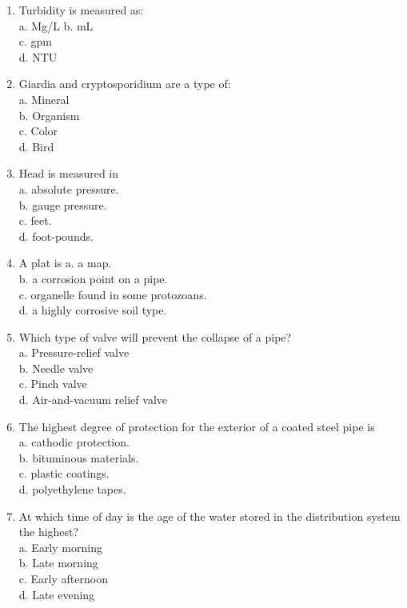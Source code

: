 \documentclass[10pt]{article}
\begin{document}
\begin{enumerate}
\item  Turbidity is measured as:\\
a.  Mg/L
b.  mL\\
c.  gpm\\
d.  NTU\\

\item  Giardia and cryptosporidium are a type of:\\
a.  Mineral\\
b.  Organism\\
c.  Color\\
d.  Bird\\



\item Head is measured in\\
a. absolute pressure.\\
b. gauge pressure.\\
c. feet.\\
d. foot-pounds.

\item A plat is
a. a map.\\
b. a corrosion point on a pipe.\\
c. organelle found in some protozoans.\\
d. a highly corrosive soil type.

\item Which type of valve will prevent the collapse of a pipe?\\
a. Pressure-relief valve\\
b. Needle valve\\
c. Pinch valve\\
d. Air-and-vacuum relief valve

  \item The highest degree of protection for the exterior of a coated steel pipe is\\
a. cathodic protection.\\
b. bituminous materials.\\
c. plastic coatings.\\
d. polyethylene tapes.

  \item At which time of day is the age of the water stored in the distribution system the highest?\\
a. Early morning\\
b. Late morning\\
c. Early afternoon\\
d. Late evening


\end{enumerate}
\end{document}
